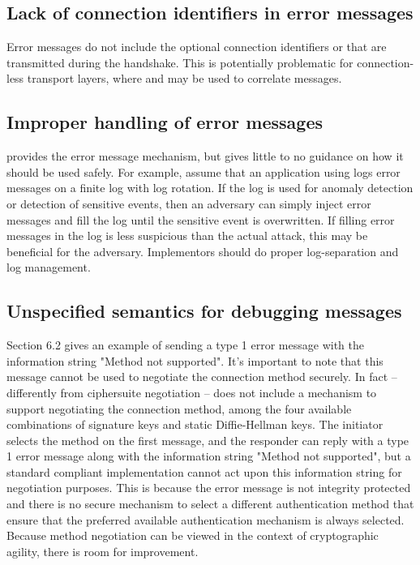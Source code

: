 \documentclass[runningheads]{llncs}
\begin{document}

\subsection{Lack of connection identifiers in error messages}
Error messages do not include the optional connection identifiers \mCi{} or \mCr{} that are transmitted during the handshake.
This is potentially problematic for connection-less transport layers, where \mCi{} and \mCr{} may be used to correlate messages.

\subsection{Improper handling of error messages}
\mEdhoc{} provides the error message mechanism, but gives little to no guidance on how it should be used safely.
%
For example, assume that an application using \mEdhoc{} logs error messages on a finite log with log rotation.
%
If the log is used for anomaly detection or detection of sensitive events, then an adversary can simply inject error messages and fill the log until the sensitive event is overwritten.
%
If filling error messages in the log is less suspicious than the actual attack, this may be beneficial for the adversary.
%
Implementors should do proper log-separation and log management.

\subsection{Unspecified semantics for debugging messages}
Section 6.2 gives an example of sending a type 1 error message with the information string "Method not supported".
%
It's important to note that this message cannot be used to negotiate the connection method securely.
%
In fact -- differently from ciphersuite negotiation -- \mEdhoc{} does not include a mechanism to support negotiating the connection method, among the four available combinations of signature keys and static Diffie-Hellman keys.
%
The initiator selects the method on the first message, and the responder can reply with a type 1 error message along with the information string "Method not supported", but a standard compliant implementation cannot act upon this information string for negotiation purposes.
%
This is because the error message is not integrity protected and there is no secure mechanism to select a different authentication method that ensure that the preferred available authentication mechanism is always selected.
%
Because method negotiation can be viewed in the context of cryptographic agility, there is room for improvement.
%
\end{document}
